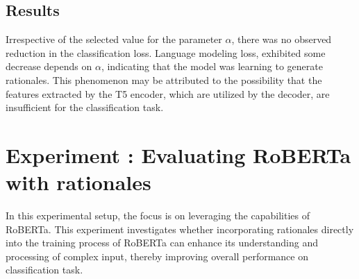 \subsection*{Results}

Irrespective of the selected value for the parameter $\alpha$, there was no observed reduction in the classification loss. Language modeling loss, exhibited some decrease depends on $\alpha$, indicating that the model was learning to generate rationales. This phenomenon may be attributed to the possibility that the features extracted by the T5 encoder, which are utilized by the decoder, are insufficient for the classification task.






\section{Experiment \theexperiment: Evaluating RoBERTa with rationales}
\label{sec:roberta_rationales}

In this experimental setup, the focus is on leveraging the capabilities of RoBERTa. This experiment investigates whether incorporating rationales directly into the training process of RoBERTa can enhance its understanding and processing of complex input, thereby improving overall performance on classification task.


